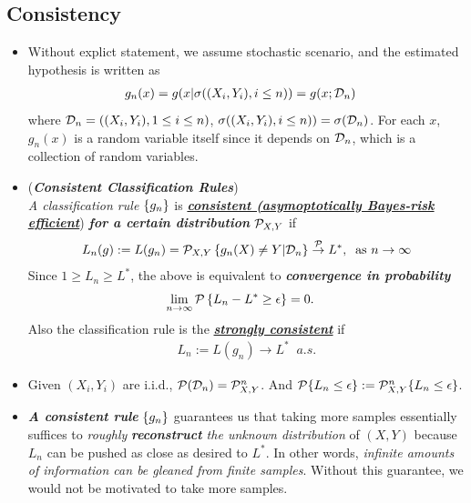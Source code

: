 \documentclass[11pt]{article}
\begin{document}
\subsection{Consistency}
\begin{itemize}
\item \begin{remark}
Without explict statement, we assume stochastic scenario, and the estimated hypothesis is written as
\begin{align*}
g_n(x) &= g(x | \sigma((X_i, Y_i), i \le n)) = g(x; {\mathcal D}_n)
\end{align*} where ${\mathcal D}_{n} = ((X_{i}, Y_{i}), 1\le i\le n)$, $\sigma((X_i, Y_i), i \le n)) = \sigma({\mathcal D}_n)$. For each $x$, $g_n(x)$ is a random variable itself since it depends on ${\mathcal D}_n$, which is a collection of random variables.
\end{remark}

\item 
\begin{definition} (\emph{\textbf{Consistent Classification Rules}})\\
\emph{A classification rule} $\left\{g_n\right\}$ is \underline{\emph{\textbf{consistent (asymoptotically Bayes-risk efficient}}}) \emph{\textbf{for a certain distribution}} ${\mathcal P}_{X,Y}$ if 
\begin{align*}
L_n(g) := L(g_n) =  {\mathcal P}_{X,Y}\left\{ g_n(X)\neq Y | {\mathcal D}_n\right\} \stackrel{{\mathcal P}}{\rightarrow} L^{*},\;\; \text{as } n\rightarrow \infty
\end{align*}
Since $1\ge L_{n} \ge  L^{*}$, the above is equivalent to \emph{\textbf{convergence in probability}} 
\begin{align*}
\lim\limits_{n\rightarrow \infty}{\mathcal P}\left\{ L_{n} - L^{*}\ge \epsilon \right\}&= 0.
\end{align*}
Also the classification rule is the \underline{\emph{\textbf{strongly consistent}}} if 
\begin{align*}
L_{n} :=  L(g_n) \rightarrow L^{*} \;\; a.s.
\end{align*}
\end{definition}

\item \begin{remark}
Given $(X_i, Y_i)$ are i.i.d., ${\mathcal P}({\mathcal D}_n) = {\mathcal P}_{X, Y}^n$. And ${\mathcal P}\{L_{n} \le \epsilon\} := {\mathcal P}_{X,Y}^{n}\{L_{n} \le \epsilon\}$.
\end{remark}


\item \begin{remark}
\emph{\textbf{A consistent rule}} $\left\{g_n\right\}$ guarantees us that taking more samples essentially suffices to \emph{roughly} \emph{\textbf{reconstruct} the unknown distribution} of $(X, Y)$ because $L_n$ can be pushed as close as desired to $L^{*}$. In other words, \emph{infinite amounts of information can be gleaned from finite samples}. Without this guarantee, we would not be motivated to take more samples. 


\end{remark}
\end{itemize}
\end{document}
